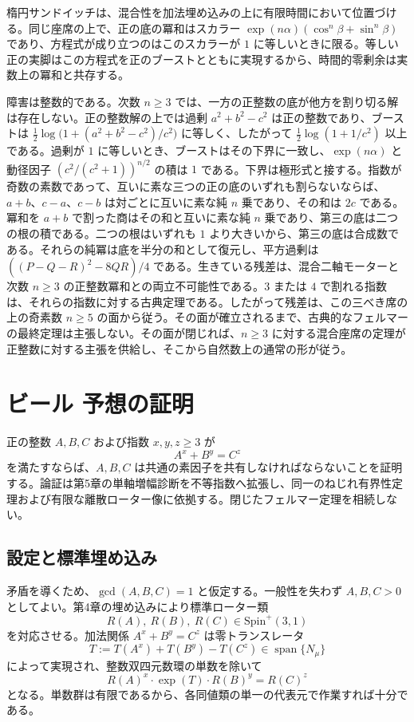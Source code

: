 \documentclass[a4paper]{article}
\theoremstyle{definition}
\theoremstyle{remark}
\begin{document}
楕円サンドイッチは、混合性を加法埋め込みの上に有限時間において位置づける。同じ座席の上で、正の底の冪和はスカラー \(\exp(n\alpha)(\cos^n\beta+\sin^n\beta)\) であり、方程式が成り立つのはこのスカラーが \(1\) に等しいときに限る。等しい正の実脚はこの方程式を正のブーストとともに実現するから、時間的零剰余は実数上の冪和と共存する。

障害は整数的である。次数 \(n\ge 3\) では、一方の正整数の底が他方を割り切る解は存在しない。正の整数解の上では過剰 \(a^2+b^2-c^2\) は正の整数であり、ブーストは \(\frac12\log\bigl(1+(a^2+b^2-c^2)/c^2\bigr)\) に等しく、したがって \(\frac12\log(1+1/c^2)\) 以上である。過剰が \(1\) に等しいとき、ブーストはその下界に一致し、\(\exp(n\alpha)\) と動径因子 \((c^2/(c^2+1))^{n/2}\) の積は \(1\) である。下界は極形式と接する。指数が奇数の素数であって、互いに素な三つの正の底のいずれも割らないならば、\(a+b\)、\(c-a\)、\(c-b\) は対ごとに互いに素な純 \(n\) 乗であり、その和は \(2c\) である。冪和を \(a+b\) で割った商はその和と互いに素な純 \(n\) 乗であり、第三の底は二つの根の積である。二つの根はいずれも \(1\) より大きいから、第三の底は合成数である。それらの純冪は底を半分の和として復元し、平方過剰は \(((P-Q-R)^2-8QR)/4\) である。生きている残差は、混合二軸モーターと次数 \(n\ge 3\) の正整数冪和との両立不可能性である。\(3\) または \(4\) で割れる指数は、それらの指数に対する古典定理である。したがって残差は、この三べき席の上の奇素数 \(n\ge 5\) の面から従う。その面が確立されるまで、古典的なフェルマーの最終定理は主張しない。その面が閉じれば、\(n\ge 3\) に対する混合座席の定理が正整数に対する主張を供給し、そこから自然数上の通常の形が従う。

\section{ビール 予想の証明}

正の整数 \( A, B, C \) および指数 \( x, y, z \geq 3 \) が
\[
A^x + B^y = C^z
\]
を満たすならば、\( A, B, C \) は共通の素因子を共有しなければならないことを証明する。論証は第5章の単軸増幅診断を不等指数へ拡張し、同一のねじれ有界性定理および有限な離散ローター像に依拠する。閉じたフェルマー定理を相続しない。

\subsection{設定と標準埋め込み}

矛盾を導くため、\(\gcd(A,B,C) = 1\) と仮定する。一般性を失わず \( A, B, C > 0 \) としてよい。第4章の埋め込みにより標準ローター類
\[
R(A),\ R(B),\ R(C) \in \mathrm{Spin}^+(3,1)
\]
を対応させる。加法関係 \( A^x + B^y = C^z \) は零トランスレータ
\[
T := T(A^x) + T(B^y) - T(C^z) \in \operatorname{span}\{N_\mu\}
\]
によって実現され、整数双四元数環の単数を除いて
\[
R(A)^x \cdot \exp(T) \cdot R(B)^y = R(C)^z
\]
となる。単数群は有限であるから、各同値類の単一の代表元で作業すれば十分である。
\end{document}
